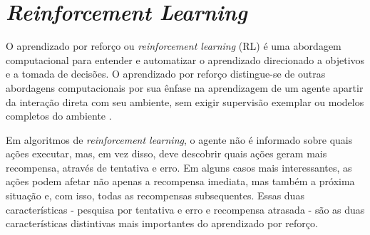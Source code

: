  \section{\textit{Reinforcement Learning}} %
 \label{sec:reinforcement_learning}

 O aprendizado por reforço ou \textit{reinforcement learning} (RL) é uma abordagem computacional para entender e automatizar o aprendizado direcionado a objetivos e a tomada de decisões. O aprendizado por reforço distingue-se de outras abordagens computacionais por sua ênfase na aprendizagem de um agente apartir da interação direta com seu ambiente, sem exigir supervisão exemplar ou modelos completos do ambiente \cite{reinforcement-learning-intro-2018}.

 Em algoritmos de \textit{reinforcement learning}, o agente não é informado sobre quais ações executar, mas, em vez disso, deve descobrir quais ações geram mais recompensa, através de tentativa e erro. Em alguns casos mais interessantes, as ações podem afetar não apenas a recompensa imediata, mas também a próxima situação e, com isso, todas as recompensas subsequentes. Essas duas características - pesquisa por tentativa e erro e recompensa atrasada - são as duas características distintivas mais importantes do aprendizado por reforço.



